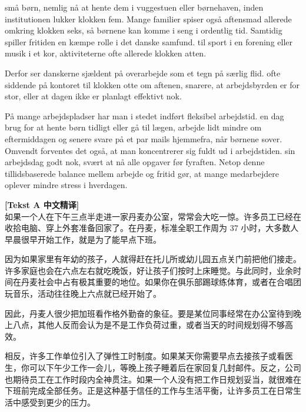  små børn,  nemlig nå at hente dem i vuggestuen eller børnehaven, inden institutionen lukker klokken fem. Mange familier spiser også aftensmad allerede omkring klokken seks, så børnene kan komme i seng i ordentlig tid. Samtidig spiller fritiden en kæmpe rolle i det danske samfund.  til sport i en forening eller  musik i et kor,  aktiviteterne ofte allerede klokken atten.

Derfor ser danskerne sjældent på overarbejde som et tegn på særlig flid.  ofte siddende på kontoret til klokken otte om aftenen,  snarere, at arbejdsbyrden er for stor, eller at dagen ikke er planlagt effektivt nok.

På mange arbejdspladser har man i stedet indført fleksibel arbejdstid.  en dag brug for at hente børn tidligt eller gå til lægen,  arbejde lidt mindre om eftermiddagen og senere svare på et par mails hjemmefra, når børnene sover. Omvendt forventes det også, at man koncentrerer sig fuldt ud i arbejdstiden.   sin arbejdsdag godt nok,  svært at nå alle opgaver før fyraften. Netop denne tillidsbaserede balance mellem arbejde og fritid gør, at mange medarbejdere oplever mindre stress i hverdagen.

\begin{transbox}
\small
\textbf{\color{NCDTeal}[Tekst A 中文精译]}\\
如果一个人在下午三点半走进一家丹麦办公室，常常会大吃一惊。许多员工已经在收拾电脑、穿上外套准备回家了。在丹麦，标准全职工作周为 37 小时，大多数人早晨很早开始工作，就是为了能早点下班。

因为如果家里有年幼的孩子，人就得赶在托儿所或幼儿园五点关门前把他们接走。许多家庭也会在六点左右就吃晚饭，好让孩子们按时上床睡觉。与此同时，业余时间在丹麦社会中占有极其重要的地位。如果你在俱乐部踢球练体育，或者在合唱团玩音乐，活动往往晚上六点就已经开始了。

因此，丹麦人很少把加班看作格外勤奋的象征。要是某位同事经常在办公室待到晚上八点，其他人反而会认为是不是工作负荷过重，或者当天的时间规划得不够高效。

相反，许多工作单位引入了弹性工时制度。如果某天你需要早点去接孩子或看医生，你可以下午少工作一会儿，等晚上孩子睡着后在家回复几封邮件。反之，公司也期待员工在工作时段内全神贯注。如果一个人没有把工作日规划妥当，就很难在下班前完成全部任务。正是这种基于信任的工作与生活平衡，让许多员工在日常生活中感受到更少的压力。
\end{transbox}

